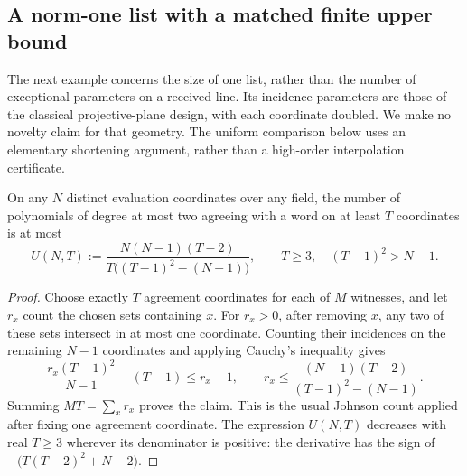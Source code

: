 \subsection{A norm-one list with a matched finite upper bound}
\label{sec:norm-one-direct-list}

The next example concerns the size of one list, rather than the number
of exceptional parameters on a received line. Its incidence parameters
are those of the classical projective-plane design, with each coordinate
doubled. We make no novelty claim for that geometry.
The uniform comparison below uses an elementary shortening argument,
rather than a high-order interpolation certificate.

\begin{lemma}\label{lem:quadratic-shortening-list}
On any $N$ distinct evaluation coordinates over any field, the number
of polynomials of degree at most two agreeing with a word on at least
$T$ coordinates is at most
\[
 U(N,T):=\frac{N(N-1)(T-2)}
 {T\bigl((T-1)^2-(N-1)\bigr)},
 \qquad T\ge3,\quad (T-1)^2>N-1.
\]
\end{lemma}

\begin{proof}
Choose exactly $T$ agreement coordinates for each of $M$ witnesses,
and let $r_x$ count the chosen sets containing $x$.
For $r_x>0$, after removing $x$, any two of these sets intersect in at most
one coordinate. Counting their incidences on the remaining $N-1$
coordinates and applying Cauchy's inequality gives
\[
 \frac{r_x(T-1)^2}{N-1}-(T-1)\le r_x-1,
 \qquad
 r_x\le\frac{(N-1)(T-2)}{(T-1)^2-(N-1)}.
\]
Summing $MT=\sum_xr_x$ proves the claim. This is the usual Johnson
count applied after fixing one agreement coordinate. The expression
$U(N,T)$ decreases with real $T\ge3$ wherever its denominator is positive:
the derivative has the sign of
$-\bigl(T(T-2)^2+N-2\bigr)$.
\end{proof}

